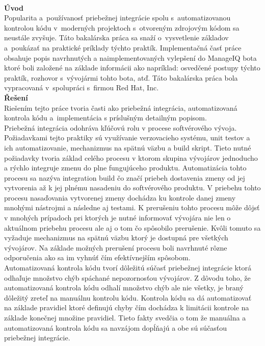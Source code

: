 \\
\textbf{Úvod}\\[0.25em]
Popularita a~používanosť priebežnej integrácie spolu s~automatizovanou kontrolou kódu v~moderných projektoch s~otvoreným zdrojovým kódom sa neustále zvyšuje. Táto bakalárska práca sa snaží o~vysvetlenie základov a~poukázať na praktické príklady týchto praktík. Implementačná časť práce obsahuje popis navrhnutých a naimplementovaných vylepšení do ManageIQ bota ktoré boli založené na základe informácii ako napríklad: osvedčené postupy týchto praktík, rozhovor s~vývojármi tohto bota, atď. Táto bakalárska práca bola vypracovaná v~spolupráci s~firmou Red Hat, Inc.\\[1em]
\textbf{Řešení}\\[0.25em]
Riešením tejto práce tvoria časti ako priebežná integrácia, automatizovaná kontrola kódu a~implementácia s príslušným detailným popisom.\\[0.25em]
\indent Priebežná integrácia odohráva kľúčovú rolu v procese softvérového vývoja. Požiadavkami tejto praktiky sú využívanie verzovacieho systému, unit testov a ich automatizovanie, mechanizmus na spätnú väzbu a build skript. Tieto nutné požiadavky tvoria základ celého procesu v ktorom skupina vývojárov jednoducho a rýchlo integruje zmenu do plne fungujúceho produktu. Automatizácia tohto procesu sa nazýva integration build čo značí priebeh dostavenia zmeny od jej vytvorenia až k jej plnému nasadeniu do softvérového produktu. V priebehu tohto procesu nasaďovania vytvorenej zmeny dochádza ku kontrole danej zmeny mnohými nástrojmi a následne aj testami. K prerušeniu tohto procesu môže dôjsť v mnohých prípadoch pri ktorých je nutné informovať vývojára nie len o aktuálnom priebehu procesu ale aj o tom čo spôsobilo prerušenie. Kvôli tomuto sa vyžaduje mechanizmus na spätnú väzbu ktorý je dostupná pre všetkých vývojárov. Na základe možných prerušení procesu boli navrhnuté rôzne odporučenia ako sa im vyhnúť čím efektívnejším spôsobom.\\[0.25em]
\indent Automatizovaná kontrola kódu tvorí dôležitú súčasť priebežnej integrácie ktorá odhaľuje množstvo chýb spáchané nepozornosťou vývojárov. Z dôvodu toho, že automatizovaná kontrola kódu odhalí množstvo chýb ale nie všetky, je braný dôležitý zreteľ na manuálnu kontrolu kódu. Kontrola kódu sa dá automatizovať na základe pravidiel ktoré definujú chyby čím dochádza k limitácii kontrole na základe konečnej množine pravidiel. Tieto fakty svedčia o tom že manuálna a automatizovaná kontrola kódu sa navzájom dopĺňajú a obe sú súčasťou priebežnej integrácie.\\[0.25em]
